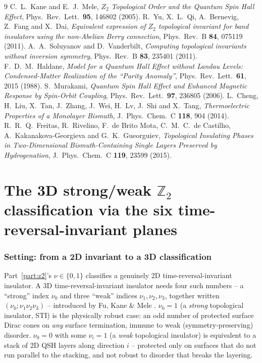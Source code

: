\documentclass[11pt]{article}
\begin{document}
\begin{thebibliography}{9}
C.~L.~Kane and E.~J.~Mele,
\emph{$Z_2$ Topological Order and the Quantum Spin Hall Effect},
Phys.\ Rev.\ Lett.\ \textbf{95}, 146802 (2005).
R.~Yu, X.~L.~Qi, A.~Bernevig, Z.~Fang and X.~Dai,
\emph{Equivalent expression of $Z_2$ topological invariant for band insulators using the
non-Abelian Berry connection},
Phys.\ Rev.\ B \textbf{84}, 075119 (2011).
A.~A.~Soluyanov and D.~Vanderbilt,
\emph{Computing topological invariants without inversion symmetry},
Phys.\ Rev.\ B \textbf{83}, 235401 (2011).
F.~D.~M.~Haldane,
\emph{Model for a Quantum Hall Effect without Landau Levels: Condensed-Matter
Realization of the ``Parity Anomaly''},
Phys.\ Rev.\ Lett.\ \textbf{61}, 2015 (1988).
S.~Murakami,
\emph{Quantum Spin Hall Effect and Enhanced Magnetic Response by Spin-Orbit Coupling},
Phys.\ Rev.\ Lett.\ \textbf{97}, 236805 (2006).
L.~Cheng, H.~Liu, X.~Tan, J.~Zhang, J.~Wei, H.~Lv, J.~Shi and X.~Tang,
\emph{Thermoelectric Properties of a Monolayer Bismuth},
J.\ Phys.\ Chem.\ C \textbf{118}, 904 (2014).
R.~R.~Q.~Freitas, R.~Rivelino, F.~de Brito Mota, C.~M.~C.~de Castilho,
A.~Kakanakova-Georgieva and G.~K.~Gueorguiev,
\emph{Topological Insulating Phases in Two-Dimensional Bismuth-Containing Single Layers
Preserved by Hydrogenation},
J.\ Phys.\ Chem.\ C \textbf{119}, 23599 (2015).
\end{thebibliography}

\part{The 3D strong/weak $\mathbb Z_2$ classification via the six time-reversal-invariant planes}
\label{part:z2threed}

\section{Setting: from a 2D invariant to a 3D classification}

Part~\ref{part:z2}'s $\nu\in\{0,1\}$ classifies a genuinely 2D time-reversal-invariant
insulator. A 3D time-reversal-invariant insulator needs four such numbers -- a
``strong'' index $\nu_0$ and three ``weak'' indices $\nu_1,\nu_2,\nu_3$, together
written $(\nu_0;\nu_1\nu_2\nu_3)$ -- introduced by Fu, Kane \& Mele
\cite{fukanemele2007}. $\nu_0=1$ (a \emph{strong} topological insulator, STI) is the
physically robust case: an odd number of protected surface Dirac cones on \emph{any}
surface termination, immune to weak (symmetry-preserving) disorder. $\nu_0=0$ with some
$\nu_i=1$ (a \emph{weak} topological insulator) is equivalent to a stack of 2D QSH
layers along direction $i$ -- protected only on surfaces that do not run parallel to the
stacking, and not robust to disorder that breaks the layering.
\end{document}
